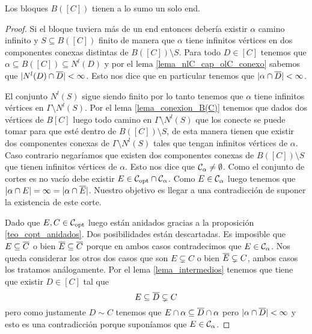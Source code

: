 \documentclass[tesis.tex]{subfiles}
\begin{document}
\begin{lema}\label{lema_bloques_1_end}
	Los bloques $B([C])$ tienen a lo sumo un solo end.
\end{lema}
\begin{proof}
	Si el bloque tuviera más de un end entonces debería existir $\alpha$ camino infinito y $S \subseteq B([C])$ finito de manera que $\alpha$ tiene infinitos vértices en dos componentes conexas distintas de $B([C]) \setminus S$.
	Para todo $D \in [C]$ tenemos que $\alpha \subseteq B([C]) \subseteq N^l(D)$ y por el lema \ref{lema_nlC_cap_olC_conexo} sabemos que $|N^l(D) \cap \overline D | < \infty$.
	Esto nos dice que en particular tenemos que $|\alpha \cap \overline D| < \infty$.
	
	El conjunto $N^l(S)$ sigue siendo finito por lo tanto tenemos que $\alpha$ tiene infinitos vértices en $\Gamma \setminus N^l(S)$.
	Por el lema \ref{lema_conexion_B(C)} tenemos que dados dos vértices de $B[C]$ luego todo camino en $\Gamma \setminus N^l(S)$ que los conecte se puede tomar para que esté dentro de $B([C]) \setminus S$, de esta manera tienen que existir dos componentes conexas de $\Gamma \setminus N^l(S)$ tales que tengan infinitos vértices de $\alpha$. 
	Caso contrario negaríamos que existen dos componentes conexas de $B([C]) \setminus S$ que tienen infinitos vértices de $\alpha$.
	Esto nos dice que ${\cal C}_{\alpha} \neq \emptyset$.
	Como el conjunto de cortes es no vacío debe existir $E \in {\cal C}_{\text{opt}} \cap {\cal C}_{\alpha}$.
	Como $E \in {\cal C}_{\alpha}$ luego tenemos que $|\alpha \cap E| = \infty = |\alpha \cap \overline E|$.
	Nuestro objetivo es llegar a una contradicción de suponer la existencia de este corte. 	
	
	Dado que $E,C \in {\cal C}_{\text{opt}}$ luego están anidados gracias a la proposición \ref{teo_copt_anidados}.
	Dos posibilidades están descartadas. 
	Es imposible que $E \subseteq \overline C$ o bien $\overline E \subseteq \overline C$ porque en ambos casos contradecimos que $E \in {\cal C}_{\alpha}$.
	Nos queda considerar los otros dos casos que son $E \subsetneq C$ o bien $\overline E \subsetneq C$, ambos casos los tratamos análogamente.
	Por el lema \ref{lema_intermedios} tenemos que tiene que existir $D \in [C]$ tal que 
	\[
		E \subseteq \overline D \subsetneq C
	\]
	pero como justamente $D \sim C$ tenemos que $E \cap \alpha \subseteq \overline D \cap \alpha$ pero $|\alpha \cap \overline D| < \infty$ y esto es una contradicción porque suponíamos que $E \in {\cal C}_{\alpha}$.
\end{proof}
\end{document}

